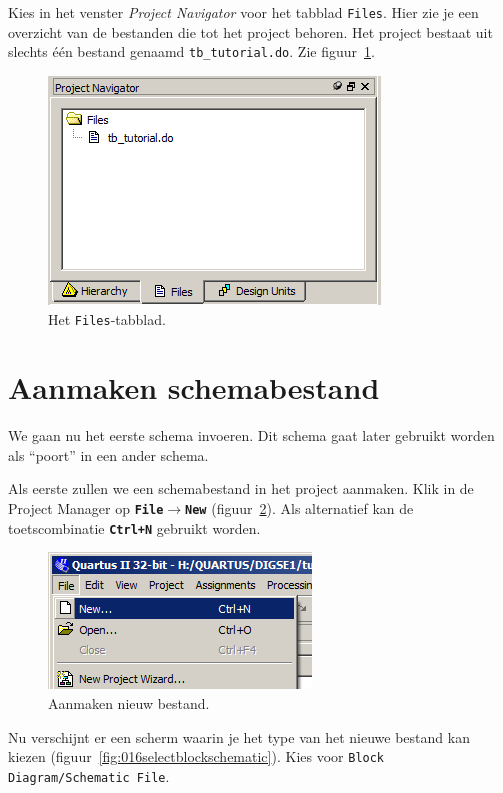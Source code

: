 \documentclass[a4paper,12pt,fleqn,twoside]{book}
\def\tutpicscale{0.455}
\newcommand{\menu}[1]{\texttt{\textbf{#1}}}
\newcommand{\knop}[1]{\texttt{\textbf{#1}}}
\newcommand{\naam}[1]{\texttt{#1}}
\def\pijl{$\rightarrow$}%
\begin{document}
Kies in het venster \textsl{Project Navigator} voor het tabblad \naam{Files}.
Hier zie je een overzicht van de bestanden die tot het project behoren. Het
project bestaat uit slechts \'{e}\'{e}n bestand genaamd
\lstinline|tb_tutorial.do|. Zie figuur~\ref{fig:014selectfilestab}.

\begin{figure}[H]
\centering
\includegraphics[scale=\tutpicscale]{014selectfilestab}
\caption{Het \lstinline|Files|-tabblad.}
\label{fig:014selectfilestab}
\end{figure}


\section{Aanmaken schemabestand}
\label{sec:aanmakenschemabestand}
We gaan nu het eerste schema invoeren. Dit schema gaat later gebruikt worden
als ``poort'' in een ander schema. 
 
Als eerste zullen we een schemabestand in het project aanmaken. Klik in de
Project Manager op \menu{File\pijl{}New} (figuur~\ref{fig:015createnewfile}).
Als alternatief kan de toetscombinatie \knop{Ctrl+N} gebruikt worden. 

\begin{figure}[H]
\centering
\includegraphics[scale=\tutpicscale]{015createnewfile}
\caption{Aanmaken nieuw bestand.}
\label{fig:015createnewfile}
\end{figure}

Nu verschijnt er een scherm waarin je het type van het nieuwe bestand kan
kiezen (figuur~\ref{fig:016selectblockschematic}). Kies voor
\naam{Block Diagram/Schematic File}.
 
\end{document}
